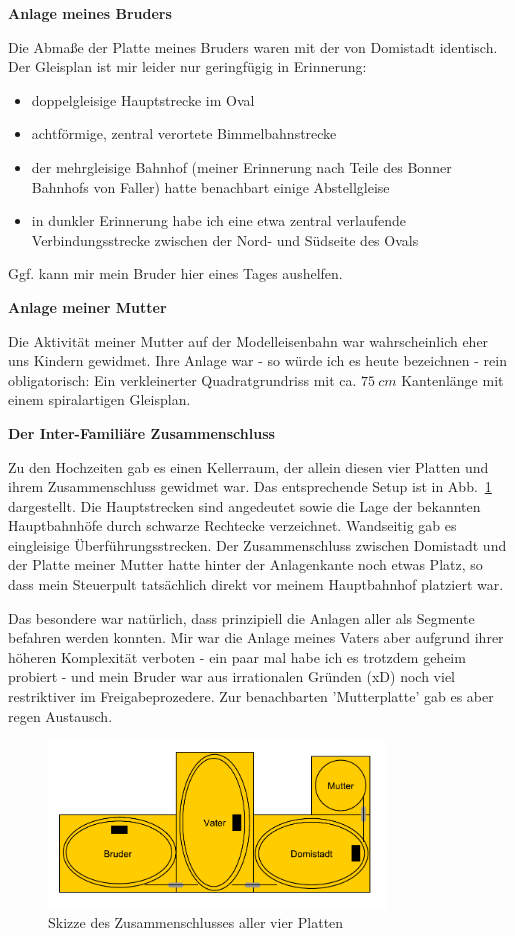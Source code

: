 \textbf{Anlage meines Bruders}

Die Abma{\ss}e der Platte meines Bruders waren mit der von Domistadt identisch.
Der Gleisplan ist mir leider nur geringf\"ugig in Erinnerung:
\begin{itemize}
	\item doppelgleisige Hauptstrecke im Oval
	\item achtf\"ormige, zentral verortete Bimmelbahnstrecke
	\item der mehrgleisige Bahnhof (meiner Erinnerung nach Teile des Bonner Bahnhofs von Faller) hatte benachbart einige Abstellgleise
	\item in dunkler Erinnerung habe ich eine etwa zentral verlaufende Verbindungsstrecke zwischen der Nord- und S\"udseite des Ovals
\end{itemize}
Ggf. kann mir mein Bruder hier eines Tages aushelfen.

\textbf{Anlage meiner Mutter}

Die Aktivit\"at meiner Mutter auf der Modelleisenbahn war wahrscheinlich eher uns Kindern gewidmet.
Ihre Anlage war - so w\"urde ich es heute bezeichnen - rein obligatorisch:
Ein verkleinerter Quadratgrundriss mit ca. $75~cm$ Kantenl\"ange mit einem spiralartigen Gleisplan.

\textbf{Der Inter-Famili\"are Zusammenschluss}

Zu den Hochzeiten gab es einen Kellerraum, der allein diesen vier Platten und ihrem Zusammenschluss gewidmet war.
Das entsprechende Setup ist in Abb.~\ref{img:elder_maps_keller_TA8} dargestellt.
Die Hauptstrecken sind angedeutet sowie die Lage der bekannten Hauptbahnh\"ofe durch schwarze Rechtecke verzeichnet.
Wandseitig gab es eingleisige \"Uberf\"uhrungsstrecken.
Der Zusammenschluss zwischen Domistadt und der Platte meiner Mutter hatte hinter der Anlagenkante noch etwas Platz, so dass mein Steuerpult tats\"achlich direkt vor meinem Hauptbahnhof platziert war.

Das besondere war nat\"urlich, dass prinzipiell die Anlagen aller als Segmente befahren werden konnten.
Mir war die Anlage meines Vaters aber aufgrund ihrer h\"oheren Komplexit\"at verboten - ein paar mal habe ich es trotzdem geheim probiert - und mein Bruder war aus irrationalen Gr\"unden (xD) noch viel restriktiver im Freigabeprozedere.
Zur benachbarten 'Mutterplatte' gab es aber regen Austausch.

\begin{figure}[h]
\centering
  \includegraphics[width=0.8\textwidth]{img/elder_maps/keller_TA8.pdf}
	\caption{Skizze des Zusammenschlusses aller vier Platten}
	\label{img:elder_maps_keller_TA8}
\end{figure}



